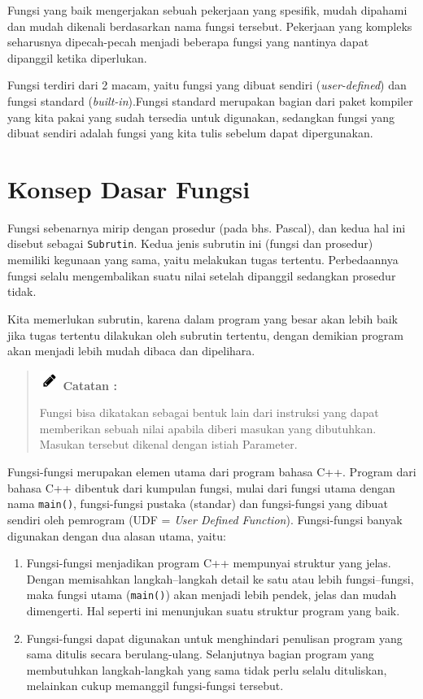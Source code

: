 Fungsi yang baik mengerjakan sebuah pekerjaan yang spesifik, mudah
dipahami dan mudah dikenali berdasarkan nama fungsi tersebut. Pekerjaan
yang kompleks seharusnya dipecah-pecah menjadi beberapa fungsi yang
nantinya dapat dipanggil ketika diperlukan.

Fungsi terdiri dari 2 macam, yaitu fungsi yang dibuat sendiri
(\emph{user-defined}) dan fungsi standard (\emph{built-in}).Fungsi
standard merupakan bagian dari paket kompiler yang kita pakai yang sudah
tersedia untuk digunakan, sedangkan fungsi yang dibuat sendiri adalah
fungsi yang kita tulis sebelum dapat dipergunakan.

\section{Konsep Dasar Fungsi}\label{konsep-dasar-fungsi}

Fungsi sebenarnya mirip dengan prosedur (pada bhs. Pascal), dan kedua
hal ini disebut sebagai \texttt{Subrutin}. Kedua jenis subrutin ini
(fungsi dan prosedur) memiliki kegunaan yang sama, yaitu melakukan tugas
tertentu. Perbedaannya fungsi selalu mengembalikan suatu nilai setelah
dipanggil sedangkan prosedur tidak.

Kita memerlukan subrutin, karena dalam program yang besar akan lebih
baik jika tugas tertentu dilakukan oleh subrutin tertentu, dengan
demikian program akan menjadi lebih mudah dibaca dan dipelihara.
\begin{quotation}
\includegraphics{../manuscript/images/pencil.png}	\textbf{Catatan :}
	
	Fungsi bisa dikatakan sebagai bentuk
	lain dari instruksi yang dapat memberikan sebuah nilai apabila diberi
	masukan yang dibutuhkan. Masukan tersebut dikenal dengan istiah
	Parameter.
\end{quotation}
 

Fungsi-fungsi merupakan elemen utama dari program bahasa C++. Program
dari bahasa C++ dibentuk dari kumpulan fungsi, mulai dari fungsi utama
dengan nama \texttt{main()}, fungsi-fungsi pustaka (standar) dan
fungsi-fungsi yang dibuat sendiri oleh pemrogram (UDF = \emph{User
Defined Function}). Fungsi-fungsi banyak digunakan dengan dua alasan
utama, yaitu:

\begin{enumerate}

\item
  Fungsi-fungsi menjadikan program C++ mempunyai struktur yang jelas.
  Dengan memisahkan langkah--langkah detail ke satu atau lebih
  fungsi--fungsi, maka fungsi utama (\texttt{main()}) akan menjadi lebih
  pendek, jelas dan mudah dimengerti. Hal seperti ini menunjukan suatu
  struktur program yang baik.
\item
  Fungsi-fungsi dapat digunakan untuk menghindari penulisan program yang
  sama ditulis secara berulang-ulang. Selanjutnya bagian program yang
  membutuhkan langkah-langkah yang sama tidak perlu selalu dituliskan,
  melainkan cukup memanggil fungsi-fungsi tersebut.
\end{enumerate}

